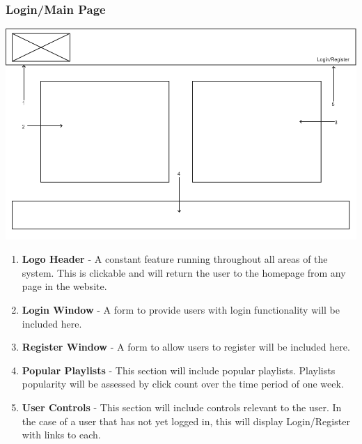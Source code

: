 \documentclass{sig-alt-release2}
\begin{document}
\subsubsection{Login/Main Page}
\includegraphics[scale=0.3]{img/login}
\begin{enumerate}
\item \textbf{Logo Header} - A constant feature running throughout all areas of the system. This is clickable and will return the user to the homepage from any page in the website.
\item \textbf{Login Window} - A form to provide users with login functionality will be included here.
\item \textbf{Register Window} - A form to allow users to register will be included here.
\item \textbf{Popular Playlists} - This section will include popular playlists. Playlists popularity will be assessed by click count over the time period of one week.
\item \textbf{User Controls} - This section will include controls relevant to the user. In the case of a user that has not yet logged in, this will display Login/Register with links to each.
\end{enumerate}
\end{document}
